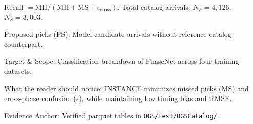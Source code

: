 \begin{table}[htbp]
\begin{threeparttable}
\begin{tablenotes}[flushleft]
      \item[d] Recall $= \mathrm{MH} / (\mathrm{MH} + \mathrm{MS} + \epsilon_{\mathrm{cross}})$. Total catalog arrivals: $N_P = 4{,}126$, $N_S = 3{,}003$.
      \item[e] Proposed picks ($\mathrm{PS}$): Model candidate arrivals without reference catalog counterpart.
      \item Target \& Scope: Classification breakdown of PhaseNet across four training datasets.
      \item What the reader should notice: INSTANCE minimizes missed picks ($\mathrm{MS}$) and cross-phase confusion ($\epsilon$), while maintaining low timing bias and RMSE.
      \item Evidence Anchor: Verified parquet tables in \texttt{OGS/test/OGSCatalog/}.
    \end{tablenotes}
  \end{threeparttable}
\end{table}


